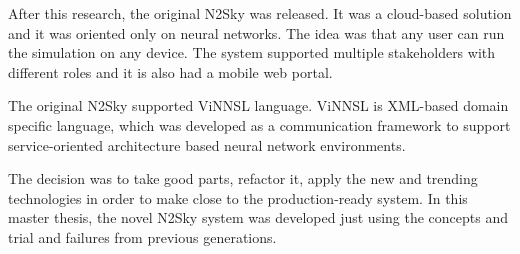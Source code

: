 After this research, the original N2Sky \cite{N2Sky} was released. It was a cloud-based solution and it was oriented only on neural networks. The idea was that any user can run the simulation on any device. The system supported multiple stakeholders with different roles and it is also had a mobile web portal. 

The original N2Sky supported ViNNSL language. ViNNSL is XML-based domain specific language, which was developed as a communication framework to support service-oriented architecture based neural network environments. 

The decision was to take good parts, refactor it, apply the new and trending technologies in order to make close to the production-ready system. In this master thesis, the novel N2Sky system was developed just using the concepts and trial and failures from previous generations. 

